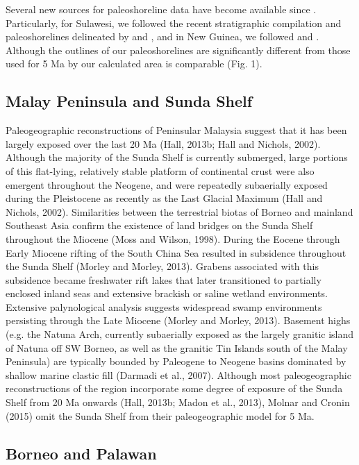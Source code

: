 \documentclass[11pt,letterpaper]{article}
\begin{document}
Several new sources for paleoshoreline data have become available since \citet{Molnar2015a}. Particularly, for Sulawesi, we followed the recent stratigraphic compilation and paleoshorelines delineated by \citet{Nugraha2018a} and \citet{Hall2018a}, and in New Guinea, we followed \citet{Gold2017a} and \cite{Harrington2017a}. Although the outlines of our paleoshorelines are significantly different from those used for 5 Ma by \citet{Molnar2015a} our calculated area is comparable (Fig. 1). 

\subsection*{Malay Peninsula and Sunda Shelf}

Paleogeographic reconstructions of Peninsular Malaysia suggest that it has been largely exposed over the last 20 Ma (Hall, 2013b; Hall and Nichols, 2002). Although the majority of the Sunda Shelf is currently submerged, large portions of this flat-lying, relatively stable platform of continental crust were also emergent throughout the Neogene, and were repeatedly subaerially exposed during the Pleistocene as recently as the Last Glacial Maximum (Hall and Nichols, 2002). Similarities between the terrestrial biotas of Borneo and mainland Southeast Asia confirm the existence of land bridges on the Sunda Shelf throughout the Miocene (Moss and Wilson, 1998). During the Eocene through Early Miocene rifting of the South China Sea resulted in subsidence throughout the Sunda Shelf (Morley and Morley, 2013). Grabens associated with this subsidence became freshwater rift lakes that later transitioned to partially enclosed inland seas and extensive brackish or saline wetland environments. Extensive palynological analysis suggests widespread swamp environments persisting through the Late Miocene (Morley and Morley, 2013). Basement highs (e.g. the Natuna Arch, currently subaerially exposed as the largely granitic island of Natuna off SW Borneo, as well as the granitic Tin Islands south of the Malay Peninsula) are typically bounded by Paleogene to Neogene basins dominated by shallow marine clastic fill (Darmadi et al., 2007). Although most paleogeographic reconstructions of the region incorporate some degree of exposure of the Sunda Shelf from 20 Ma onwards (Hall, 2013b; Madon et al., 2013), Molnar and Cronin (2015) omit the Sunda Shelf from their paleogeographic model for 5 Ma.

\subsection*{Borneo and Palawan}
\end{document}
